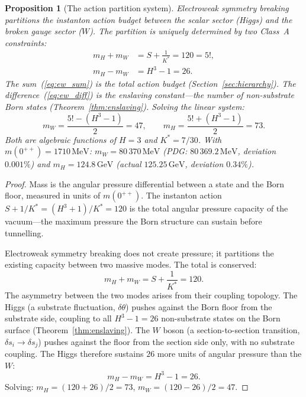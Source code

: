 \documentclass[11pt,a4paper]{article}
\newtheorem{proposition}[theorem]{Proposition}
\theoremstyle{definition}
\theoremstyle{remark}
\begin{document}
\begin{proposition}[The action partition system]\label{prop:action_partition}
Electroweak symmetry breaking partitions the instanton action budget between the scalar sector (Higgs) and the broken gauge sector ($W$). The partition is uniquely determined by two Class~A constraints:
\begin{align}
m_H + m_W &= S + \frac{1}{K^*} = 120 = 5!, \label{eq:ew_sum}\\
m_H - m_W &= H^3 - 1 = 26. \label{eq:ew_diff}
\end{align}
The sum~(\ref{eq:ew_sum}) is the total action budget (Section~\ref{sec:hierarchy}). The difference~(\ref{eq:ew_diff}) is the enslaving constant---the number of non-substrate Born states (Theorem~\ref{thm:enslaving}). Solving the linear system:
\begin{equation}\label{eq:ew_solution}
m_W = \frac{5!-(H^3-1)}{2} = 47, \qquad m_H = \frac{5!+(H^3-1)}{2} = 73.
\end{equation}
Both are algebraic functions of $H=3$ and $K^*=7/30$. With $m(0^{++})=1710\,\mathrm{MeV}$: $m_W=80\,370\,\mathrm{MeV}$ (PDG: $80\,369.2\,\mathrm{MeV}$, deviation $0.001\%$) and $m_H=124.8\,\mathrm{GeV}$ (actual $125.25\,\mathrm{GeV}$, deviation $0.34\%$).
\end{proposition}

\begin{proof}
Mass is the angular pressure differential between a state and the Born floor, measured in units of $m(0^{++})$. The instanton action $S+1/K^*=(H^3+1)/K^*=120$ is the total angular pressure capacity of the vacuum---the maximum pressure the Born structure can sustain before tunnelling.

Electroweak symmetry breaking does not create pressure; it partitions the existing capacity between two massive modes. The total is conserved:
\[
m_H+m_W = S+\frac{1}{K^*} = 120.
\]
The asymmetry between the two modes arises from their coupling topology. The Higgs (a substrate fluctuation, $\delta\theta$) pushes against the Born floor from the substrate side, coupling to all $H^3-1=26$ non-substrate states on the Born surface (Theorem~\ref{thm:enslaving}). The $W$ boson (a section-to-section transition, $\delta s_i\to\delta s_j$) pushes against the floor from the section side only, with no substrate coupling. The Higgs therefore sustains $26$ more units of angular pressure than the $W$:
\[
m_H-m_W = H^3-1 = 26.
\]
Solving: $m_H=(120+26)/2=73$, $m_W=(120-26)/2=47$.
\end{proof}
\end{document}
